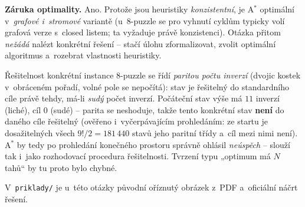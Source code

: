 \begin{priklad}
\textbf{Záruka optimality.} Ano. Protože jsou heuristiky \emph{konzistentní}, je A${}^\ast$ optimální v~\emph{grafové i~stromové} variantě (u~8-puzzle se pro vyhnutí cyklům typicky volí grafová verze s~closed listem; ta vyžaduje právě konzistenci). Otázka přitom \emph{nežádá} nalézt konkrétní řešení -- stačí úlohu zformalizovat, zvolit optimální algoritmus a~rozebrat vlastnosti heuristiky.

\begin{poznamka}
Řešitelnost konkrétní instance 8-puzzle se řídí \emph{paritou počtu inverzí} (dvojic kostek v~obráceném pořadí, volné pole se nepočítá): stav je řešitelný do standardního cíle právě tehdy, má-li \emph{sudý} počet inverzí. Počáteční stav výše má $11$ inverzí (liché), cíl $0$ (sudé) -- parita se neshoduje, takže tento konkrétní stav \textbf{není} do daného cíle řešitelný (ověřeno i~vyčerpávajícím prohledáním: ze startu je dosažitelných všech $9!/2 = 181\,440$ stavů jeho paritní třídy a~cíl mezi nimi není). A${}^\ast$ by tedy po prohledání konečného prostoru správně ohlásil \emph{neúspěch} -- slouží tak i~jako rozhodovací procedura řešitelnosti. Tvrzení typu „optimum má $N$ tahů`` by tu proto bylo chybné.
\end{poznamka}

\begin{center}
\end{center}
\end{priklad}

\noindent V~\texttt{priklady/} je u~této otázky původní oříznutý obrázek z~PDF a~oficiální náčrt řešení.
